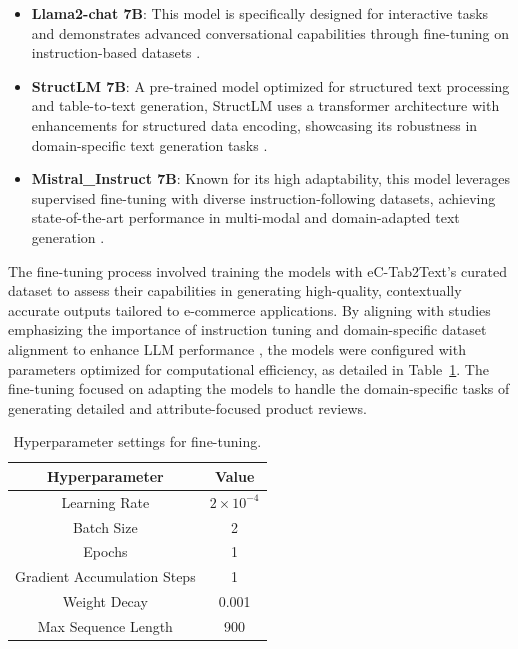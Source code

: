 \begin{itemize} 
    \item \textbf{Llama2-chat 7B}: This model is specifically designed for interactive tasks and demonstrates advanced conversational capabilities through fine-tuning on instruction-based datasets \cite{touvron2023llama}. 
    \item \textbf{StructLM 7B}: A pre-trained model optimized for structured text processing and table-to-text generation, StructLM uses a transformer architecture with enhancements for structured data encoding, showcasing its robustness in domain-specific text generation tasks \cite{zhuang2024structlm}. 
    \item \textbf{Mistral\_Instruct 7B}: Known for its high adaptability, this model leverages supervised fine-tuning with diverse instruction-following datasets, achieving state-of-the-art performance in multi-modal and domain-adapted text generation \cite{jiang2023mistral}. 
\end{itemize}

The fine-tuning process involved training the models with eC-Tab2Text's curated dataset to assess their capabilities in generating high-quality, contextually accurate outputs tailored to e-commerce applications. By aligning with studies emphasizing the importance of instruction tuning and domain-specific dataset alignment to enhance LLM performance \cite{Zhang2023InstructionTF, Chang2023ASO}, the models were configured with parameters optimized for computational efficiency, as detailed in Table~\ref{table:hyperparameters}. The fine-tuning focused on adapting the models to handle the domain-specific tasks of generating detailed and attribute-focused product reviews.

\begin{table}[ht]
    \centering
    \footnotesize
    \begin{tabular}{|c|c|}
    \hline
    \textbf{Hyperparameter} & \textbf{Value} \\
    \hline
    Learning Rate & $2 \times 10^{-4}$ \\
    Batch Size & 2 \\
    Epochs & 1 \\
    Gradient Accumulation Steps & 1 \\
    Weight Decay & 0.001 \\
    Max Sequence Length & 900 \\
    \hline
    \end{tabular}
    \caption{Hyperparameter settings for fine-tuning.}
    \label{table:hyperparameters}
\end{table}


